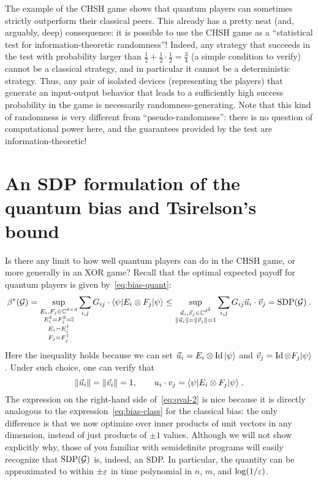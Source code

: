 The example of the CHSH game shows that quantum players can sometimes strictly outperform their classical peers. This already has a pretty neat (and, arguably, deep) consequence: it is possible to use the CHSH game as a ``statistical test for information-theoretic randomness''! Indeed, any strategy that succeeds in the test  with probability larger than $\frac{1}{2} + \frac{1}{2}\cdot\frac{1}{2}=\frac{3}{4}$ (a simple condition to verify) cannot be a classical strategy, and in particular it cannot be a deterministic strategy. Thus, any pair of isolated devices (representing the players) that generate an input-output behavior that leads to a sufficiently high success probability in the game is necessarily randomness-generating. Note that this kind of randomness is very different from ``pseudo-randomness'': there is no question of computational power here, and the guarantees provided by the test are information-theoretic!

\section{An SDP formulation of the quantum bias and Tsirelson's bound}
\label{sec:sdp-tsirelson}

Is there any limit to how well quantum players can do in the CHSH game, or more generally in an XOR game? Recall that the optimal expected payoff for quantum players is given by~\eqref{eq:bias-quant}:
\begin{equation}\label{eq:qval-2}
\beta^*(\mathcal{G})=\sup_{\substack{E_i,F_j\in\mathbb{C}^{d\times d}\\ E_i^2=F_j^2=\mathbb{I}\\ E_i=E_i^\dagger\\ F_j=F_j^\dagger}}\sum_{i,j} G_{ij}\cdot\langle\psi| E_i\otimes F_j|\psi\rangle \le \sup_{\substack{\vec{u}_i,\vec{v}_j\in \mathbb{C}^{d^2}\\ \|\vec{u}_i\|=\|\vec{v}_j\|=1}}\sum_{i,j} G_{ij}\vec{u}_i\cdot \vec{v}_j = \text{SDP}(\mathcal{G})\;.
\end{equation}
Here the inequality holds because we can set $\vec{u}_i=E_i \otimes \mathop{\rm Id}\nolimits |\psi\rangle$ and $\vec{v}_j=\mathop{\rm Id}\nolimits\otimes F_j |\psi\rangle$. Under such choice, one can verify that
$$
\|\vec{u}_i\|=\|\vec{v}_i\|=1,\qquad 
u_i\cdot v_j=\langle\psi| E_i \otimes F_j |\psi\rangle\;.
$$
The expression on the right-hand side of~\eqref{eq:qval-2} is nice because it is directly analogous to the expression~\eqref{eq:bias-class} for the classical bias: the only difference is that we now optimize over inner products of unit vectors in any dimension, instead of just products of $\pm 1$ values. Although we will not show explicitly why, those of you familiar with semidefinite programs will easily recognize that $\text{SDP}(\mathcal{G})$ is, indeed, an SDP. In particular, the quantity can be approximated to within $\pm\varepsilon$ in time polynomial in $n$, $m$, and $\log(1/\varepsilon)$. 


